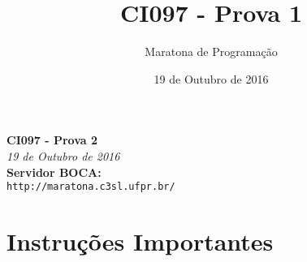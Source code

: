 \documentclass[12pt,oneside]{article} %
\title{CI097 - Prova 1}
\author{Maratona de Programação}
\date{19 de Outubro de 2016}
\begin{document}
\begin{center}
\textbf{\Huge CI097 - Prova 2}\\
\vspace{0.2cm}
\textit{19 de Outubro de 2016} \\
\vspace{1.0cm}
\textbf{Servidor BOCA:} \\
\texttt{\large http://maratona.c3sl.ufpr.br/} \\
\vspace{1.0cm}
\end{center}

\pagestyle{fancy}
\renewcommand{\footrulewidth}{0.7pt}
\renewcommand{\headrulewidth}{0.7pt}
\cfoot{\thepage}


  \section*{Instruções Importantes}
\end{document}
